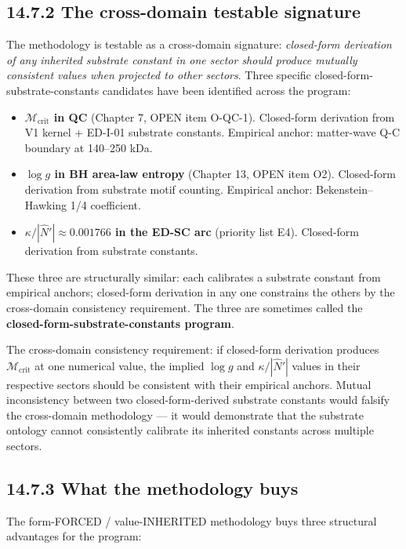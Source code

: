 \documentclass[11pt]{book}
\begin{document}
\subsection{14.7.2 The cross-domain testable signature}

The methodology is testable as a cross-domain signature: \textit{closed-form derivation of any inherited substrate constant in one sector should produce mutually consistent values when projected to other sectors}. Three specific closed-form-substrate-constants candidates have been identified across the program:

\begin{itemize}
\item \textbf{$\mathcal{M}_\mathrm{crit}$ in QC} (Chapter 7, OPEN item O-QC-1). Closed-form derivation from V1 kernel + ED-I-01 substrate constants. Empirical anchor: matter-wave Q-C boundary at 140–250 kDa.
\item \textbf{$\log g$ in BH area-law entropy} (Chapter 13, OPEN item O2). Closed-form derivation from substrate motif counting. Empirical anchor: Bekenstein–Hawking 1/4 coefficient.
\item \textbf{$\kappa/|\hat{N}'| \approx 0.001766$ in the ED-SC arc} (priority list E4). Closed-form derivation from substrate constants.
\end{itemize}

These three are structurally similar: each calibrates a substrate constant from empirical anchors; closed-form derivation in any one constrains the others by the cross-domain consistency requirement. The three are sometimes called the \textbf{closed-form-substrate-constants program}.

The cross-domain consistency requirement: if closed-form derivation produces $\mathcal{M}_\mathrm{crit}$ at one numerical value, the implied $\log g$ and $\kappa/|\hat{N}'|$ values in their respective sectors should be consistent with their empirical anchors. Mutual inconsistency between two closed-form-derived substrate constants would falsify the cross-domain methodology — it would demonstrate that the substrate ontology cannot consistently calibrate its inherited constants across multiple sectors.

\subsection{14.7.3 What the methodology buys}

The form-FORCED / value-INHERITED methodology buys three structural advantages for the program:
\end{document}
